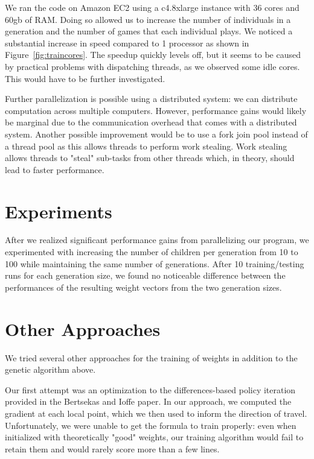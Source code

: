 \documentclass[12pt, twocolumn]{article}
\begin{document}
We ran the code on Amazon EC2 using a c4.8xlarge instance with 36 cores and 60gb of RAM. Doing so allowed us to increase the number of individuals in a generation and the number of games that each individual plays. We noticed a substantial increase in speed compared to 1 processor as shown in
Figure~\ref{fig:traincores}. The speedup quickly levels off, but it seems to be
caused by practical problems with dispatching threads, as we observed some
idle cores. This would have to be further investigated.

Further parallelization is possible using a distributed system: we can distribute computation across multiple computers. However, performance gains would likely be marginal due to the communication overhead that comes with a distributed system. Another possible improvement would be to use a fork join pool instead of a thread pool as this allows threads to perform work stealing. Work stealing allows threads to "steal" sub-tasks from other threads which, in theory, should lead to faster performance.

\section*{Experiments}

After we realized significant performance gains from parallelizing our program, we experimented with increasing the number of children per generation from 10 to 100 while maintaining the same number of generations. After 10 training/testing runs for each generation size, we found no noticeable difference between the performances of the resulting weight vectors from the two generation sizes.






\section*{Other Approaches}

We tried several other approaches for the training of weights in addition to the genetic algorithm above. 

Our first attempt was an optimization to the differences-based policy iteration provided in the Bertsekas and Ioffe paper. In our approach, we computed the gradient at each local point, which we then used to inform the direction of travel. Unfortunately, we were unable to get the formula to train properly: even when initialized with theoretically "good" weights, our training algorithm would fail to retain them and would rarely score more than a few lines.
\end{document}

